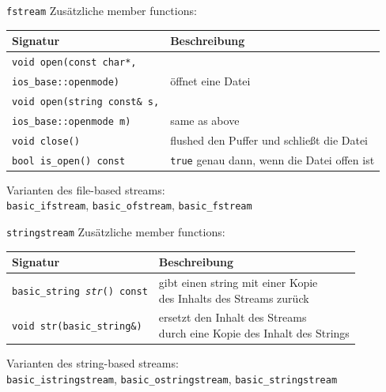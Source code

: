 \begin{frame}{\texttt{fstream}}
	Zusätzliche member functions:
	\vspace{1em}
	
	\footnotesize
	
	\begin{tabular}{ll}
		\textbf{Signatur}	&	\textbf{Beschreibung}	\\
		\hline
		\texttt{void open(const char*,}\\
			\hspace{2em} \texttt{ios\_base::openmode)}	&	öffnet eine Datei	\\
		\texttt{void open(string const\& s,}\\
			\hspace{2em} \texttt{ios\_base::openmode m)}	&	same as above	\\
		\texttt{void close()}	&	flushed den Puffer und schließt die Datei	\\
		\texttt{bool is\_open() const}	&	\texttt{true} genau dann, wenn die Datei offen ist	\\
	\end{tabular}
	
	\pause
	\vspace{2em}
	
	Varianten des file-based streams:	\\
	\texttt{basic\_ifstream}, \texttt{basic\_ofstream}, \texttt{basic\_fstream}
\end{frame}

\begin{frame}{\texttt{stringstream}}
	Zusätzliche member functions:
	\vspace{1em}
	
	\footnotesize
	
	\begin{tabular}{ll}
		\textbf{Signatur}	&	\textbf{Beschreibung}	\\
		\hline
		\texttt{basic\_string \emph{str}() const}	&	\parbox{25em}{gibt einen string mit einer Kopie\\ des Inhalts des Streams zurück}	\\
		\texttt{void str(basic\_string\&)}	&	\parbox{25em}{ersetzt den Inhalt des Streams\\ durch eine Kopie des Inhalt des Strings}	\\
	\end{tabular}
	
	\pause
	\vspace{2em}
	
	Varianten des string-based streams:	\\
	\texttt{basic\_istringstream}, \texttt{basic\_ostringstream}, \texttt{basic\_stringstream}
\end{frame}


